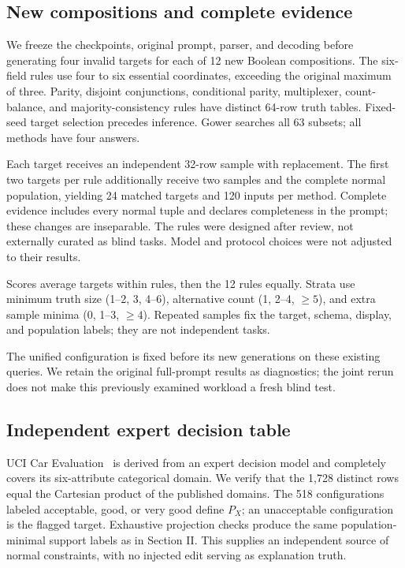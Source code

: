 \documentclass[conference]{IEEEtran}
\begin{document}
\subsection{New compositions and complete evidence}

We freeze the checkpoints, original prompt, parser, and decoding before generating four invalid targets for each of 12 new Boolean compositions. The six-field rules use four to six essential coordinates, exceeding the original maximum of three. Parity, disjoint conjunctions, conditional parity, multiplexer, count-balance, and majority-consistency rules have distinct 64-row truth tables. Fixed-seed target selection precedes inference. Gower searches all 63 subsets; all methods have four answers.

Each target receives an independent 32-row sample with replacement. The first two targets per rule additionally receive two samples and the complete normal population, yielding 24 matched targets and 120 inputs per method. Complete evidence includes every normal tuple and declares completeness in the prompt; these changes are inseparable. The rules were designed after review, not externally curated as blind tasks. Model and protocol choices were not adjusted to their results.

Scores average targets within rules, then the 12 rules equally. Strata use minimum truth size (1--2, 3, 4--6), alternative count (1, 2--4, $\geq5$), and extra sample minima (0, 1--3, $\geq4$). Repeated samples fix the target, schema, display, and population labels; they are not independent tasks.


The unified configuration is fixed before its new generations on these existing queries. We retain the original full-prompt results as diagnostics; the joint rerun does not make this previously examined workload a fresh blind test.

\subsection{Independent expert decision table}
UCI Car Evaluation~\cite{bohanec1988car} is derived from an expert decision model and completely covers its six-attribute categorical domain. We verify that the 1,728 distinct rows equal the Cartesian product of the published domains. The 518 configurations labeled acceptable, good, or very good define $P_X$; an unacceptable configuration is the flagged target. Exhaustive projection checks produce the same population-minimal support labels as in Section II. This supplies an independent source of normal constraints, with no injected edit serving as explanation truth.
\end{document}
